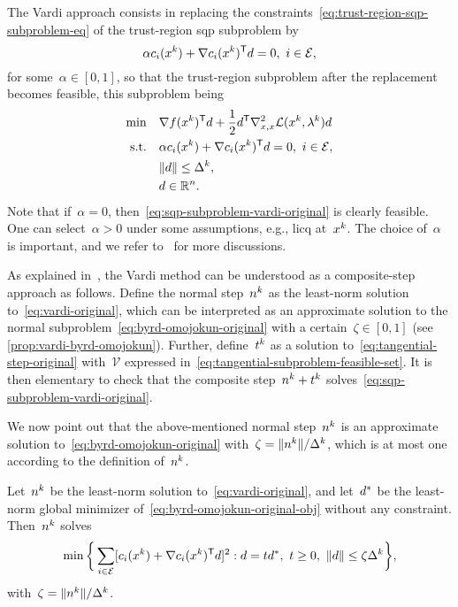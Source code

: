 The Vardi approach consists in replacing the constraints~\cref{eq:trust-region-sqp-subproblem-eq} of the trust-region \gls{sqp} subproblem by
\begin{equation}
    \label{eq:vardi-original}
    \alpha \con{i}(\iter[k]) + \nabla \con{i}(\iter[k])^{\T} \step = 0, ~ i \in \ieq,
\end{equation}
for some~$\alpha \in [0, 1]$, so that the trust-region subproblem after the replacement becomes feasible, this subproblem being
\begin{subequations}
    \label{eq:sqp-subproblem-vardi-original}
    \begin{align}
        \min        & \quad \nabla \obj(\iter[k])^{\T} \step + \frac{1}{2} \step^{\T} \nabla_{x, x}^2 \lag(\iter[k], \lm[k]) \step\\
        \text{s.t.} & \quad \alpha \con{i}(\iter[k]) + \nabla \con{i}(\iter[k])^{\T} \step = 0, ~ i \in \ieq,\\
                    & \quad \norm{\step} \le \rad[k],\\
                    & \quad \step \in \R^n. \nonumber
    \end{align}
\end{subequations}
Note that if~$\alpha = 0$, then~\cref{eq:sqp-subproblem-vardi-original} is clearly feasible.
One can select~$\alpha > 0$ under some assumptions, e.g., \gls{licq} at~$\iter[k]$.
The choice of~$\alpha$ is important, and we refer to~\cite[\S~15.4.1]{Conn_Gould_Toint_2000} for more discussions.

As explained in~\cite[\S~15.4.1]{Conn_Gould_Toint_2000}, the Vardi method can be understood as a composite-step approach as follows.
Define the normal step~$\nstep[k]$ as the least-norm solution to~\cref{eq:vardi-original}, which can be interpreted as an approximate solution to the normal subproblem~\cref{eq:byrd-omojokun-original} with a certain~$\zeta \in [0, 1]$ (see \cref{prop:vardi-byrd-omojokun}).
Further, define~$\tstep[k]$ as a solution to~\cref{eq:tangential-step-original} with~$\mathcal{V}$ expressed in~\cref{eq:tangential-subproblem-feasible-set}.
It is then elementary to check that the composite step~$\nstep[k] + \tstep[k]$ solves~\cref{eq:sqp-subproblem-vardi-original}.

We now point out that the above-mentioned normal step~$\nstep[k]$ is an approximate solution to~\cref{eq:byrd-omojokun-original} with~$\zeta = \norm{\nstep[k]} / \rad[k]$, which is at most one according to the definition of~$\nstep[k]$.

\begin{proposition}
    \label{prop:vardi-byrd-omojokun}
    Let~$\nstep[k]$ be the least-norm solution to~\cref{eq:vardi-original}, and let~$\step[\ast]$ be the least-norm global minimizer of~\cref{eq:byrd-omojokun-original-obj} without any constraint.
    Then~$\nstep[k]$ solves
    \begin{equation*}
        \min \set[\bigg]{\sum_{i \in \ieq} [\con{i}(\iter[k]) + \nabla \con{i}(\iter[k])^{\T} \step]^2 : \step = t \step[\ast], ~ t \ge 0, ~ \norm{d} \le \zeta \rad[k]},
    \end{equation*}
    with~$\zeta = \norm{\nstep[k]} / \rad[k]$.
\end{proposition}


